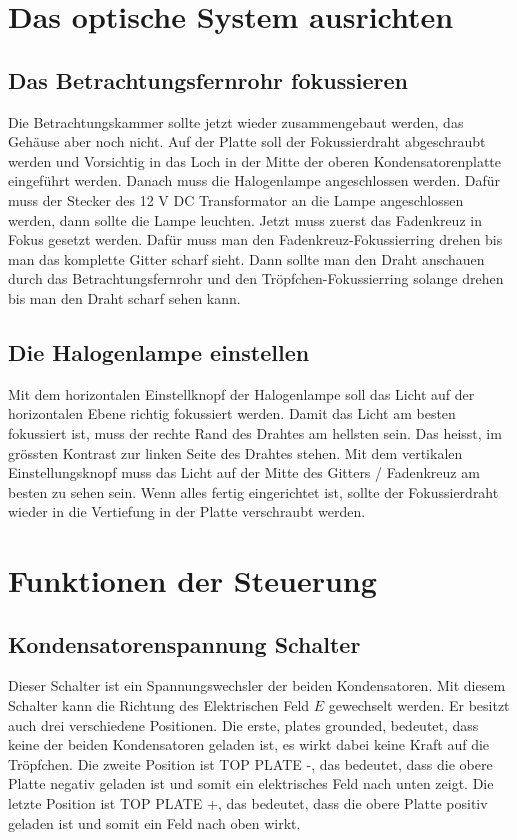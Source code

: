 \section{Das optische System ausrichten}\label{sec:optischesSystem}
\subsection{Das Betrachtungsfernrohr fokussieren}
Die Betrachtungskammer sollte jetzt wieder zusammengebaut werden, das Gehäuse aber noch nicht. Auf der Platte soll der Fokussierdraht abgeschraubt werden und Vorsichtig in das Loch in der Mitte der oberen Kondensatorenplatte eingeführt werden. Danach muss die Halogenlampe angeschlossen werden. Dafür muss der Stecker des 12 V DC Transformator an die Lampe angeschlossen werden, dann sollte die Lampe leuchten. Jetzt muss zuerst das Fadenkreuz in Fokus gesetzt werden. Dafür muss man den Fadenkreuz-Fokussierring drehen bis man das komplette Gitter scharf sieht. Dann sollte man den Draht anschauen durch das Betrachtungsfernrohr und den Tröpfchen-Fokussierring solange drehen bis man den Draht scharf sehen kann. 

\subsection{Die Halogenlampe einstellen}\label{sub:Halogenlampe}
Mit dem horizontalen Einstellknopf der Halogenlampe soll das Licht auf der horizontalen Ebene richtig fokussiert werden. Damit das Licht am besten fokussiert ist, muss der rechte Rand des Drahtes am hellsten sein. Das heisst, im grössten Kontrast zur linken Seite des Drahtes stehen. Mit dem vertikalen Einstellungsknopf muss das Licht auf der Mitte des Gitters / Fadenkreuz am besten zu sehen sein. Wenn alles fertig eingerichtet ist, sollte der Fokussierdraht wieder in die Vertiefung in der Platte verschraubt werden.

\section{Funktionen der Steuerung}\label{sec:funktionen}
\subsection{Kondensatorenspannung Schalter}\label{sub:Spannungsschalter}
Dieser Schalter ist ein Spannungswechsler der beiden Kondensatoren. Mit diesem Schalter kann die Richtung des Elektrischen Feld $E$ gewechselt werden. Er besitzt auch drei verschiedene Positionen. Die erste, plates grounded, bedeutet, dass keine der beiden Kondensatoren geladen ist, es wirkt dabei keine Kraft auf die Tröpfchen. Die zweite Position ist TOP PLATE -, das bedeutet, dass die obere Platte negativ geladen ist und somit ein elektrisches Feld nach unten zeigt. Die letzte Position ist TOP PLATE +, das bedeutet, dass die obere Platte positiv geladen ist und somit ein Feld nach oben wirkt. 


